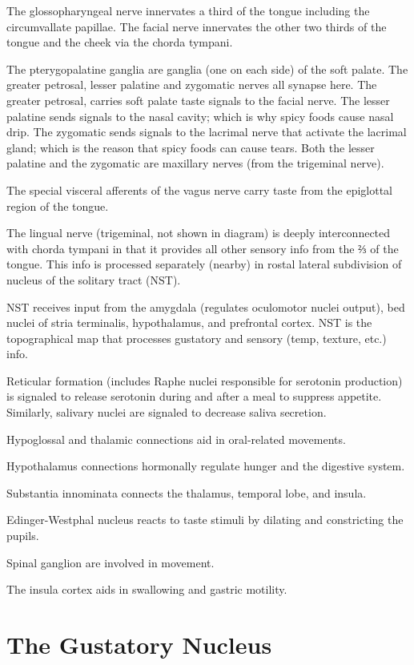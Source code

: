\documentclass[]{book}
\begin{document}
The glossopharyngeal nerve innervates a third of the tongue including the circumvallate papillae. The facial nerve innervates the other two thirds of the tongue and the cheek via the chorda tympani.

The pterygopalatine ganglia are ganglia (one on each side) of the soft palate. The greater petrosal, lesser palatine and zygomatic nerves all synapse here. The greater petrosal, carries soft palate taste signals to the facial nerve. The lesser palatine sends signals to the nasal cavity; which is why spicy foods cause nasal drip. The zygomatic sends signals to the lacrimal nerve that activate the lacrimal gland; which is the reason that spicy foods can cause tears. Both the lesser palatine and the zygomatic are maxillary nerves (from the trigeminal nerve).

The special visceral afferents of the vagus nerve carry taste from the epiglottal region of the tongue.

The lingual nerve (trigeminal, not shown in diagram) is deeply interconnected with chorda tympani in that it provides all other sensory info from the ⅔ of the tongue. This info is processed separately (nearby) in rostal lateral subdivision of nucleus of the solitary tract (NST).

NST receives input from the amygdala (regulates oculomotor nuclei output), bed nuclei of stria terminalis, hypothalamus, and prefrontal cortex. NST is the topographical map that processes gustatory and sensory (temp, texture, etc.) info.

Reticular formation (includes Raphe nuclei responsible for serotonin production) is signaled to release serotonin during and after a meal to suppress appetite. Similarly, salivary nuclei are signaled to decrease saliva secretion.

Hypoglossal and thalamic connections aid in oral-related movements.

Hypothalamus connections hormonally regulate hunger and the digestive system.

Substantia innominata connects the thalamus, temporal lobe, and insula.

Edinger-Westphal nucleus reacts to taste stimuli by dilating and constricting the pupils.

Spinal ganglion are involved in movement.

The insula cortex aids in swallowing and gastric motility.

\hypertarget{the-gustatory-nucleus}{%
\section{The Gustatory Nucleus}\label{the-gustatory-nucleus}}
\end{document}
